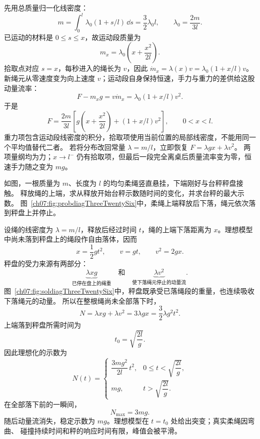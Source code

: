 {\begin{xesolution}
先用总质量归一化线密度：
\[
 m=\int_0^l\lambda_0(1+s/l)\,\dd s=\frac32\lambda_0l,
 \qquad \boxed{\lambda_0=\frac{2m}{3l}}.
\]
已运动的材料是 $0\le s\le x$，故运动段质量为
\[
 \boxed{m_x=\lambda_0\left(x+\frac{x^2}{2l}\right)}.
\]
拾取点对应 $s=x$，每秒进入的绳长为 $v$，因此
$\dot m_x=\lambda(x)v=\lambda_0(1+x/l)v$。
新绳元从零速度变为向上速度 $v$；运动段自身保持恒速，手力与重力的差供给这股动量流率：
\[
 F-m_xg=v\dot m_x=\lambda_0(1+x/l)v^2.
\]
于是
\[
 \boxed{F=\frac{2m}{3l}\left[g\left(x+\frac{x^2}{2l}\right)
 +(1+x/l)v^2\right]},\qquad 0<x<l.
\]
重力项包含运动段线密度的积分，拾取项使用当前位置的局部线密度，不能用同一个平均值替代二者。
若将分布改回常量 $\lambda=m/l$，立即恢复 $F=\lambda gx+\lambda v^2$。
两项量纲均为力；$x\to l^-$ 仍有拾取项，但最后一段完全离桌后质量流率变为零，恒速手力随之变为 $mg$。
\end{xesolution}

\begin{origexamplebox}{}\label{ch07:ex:s09-3-26}
如图，一根质量为 $m$、长度为 $l$ 的均匀柔绳竖直悬挂，下端刚好与台秤秤盘接触。
释放绳的上端，求从释放开始台秤示数随时间的变化，并求台秤的最大示数。
图~\ref{ch07:fig:probdiagThreeTwentySix}中，柔绳上端释放后下落，绳元依次落到秤盘上并停止。
\probdiagThreeTwentySix
\end{origexamplebox}

\begin{xesolution}
设绳的线密度为 $\lambda=m/l$，释放后经过时间 $t$，绳的上端下落距离为 $x$。理想模型
中尚未落到秤盘上的绳段作自由落体，因而
\[
 x=\frac12gt^2,\qquad v=gt,\qquad v^2=2gx.
\]
秤盘的受力来源有两部分：
\[
 \underbrace{\lambda xg}_{\text{已停在盘上的绳重}}
 \quad\text{和}\quad
 \underbrace{\lambda v^2}_{\text{使下落绳元停止的动量流}}.
\]
图~\ref{ch07:fig:soldiagThreeTwentySix}中，秤盘既承受已落绳段的重量，也连续吸收下落绳元的动量。
\soldiagThreeTwentySix
所以在整根绳尚未全部落下时，
\[
 N=\lambda xg+\lambda v^2
 =3\lambda gx
 =\frac32\lambda g^2t^2.
\]
上端落到秤盘所需时间为
\[
 t_0=\sqrt{\frac{2l}{g}}.
\]
因此理想化的示数为
\[
 \boxed{
 N(t)=
 \begin{cases}
 \dfrac{3m g^2}{2l}\,t^2,
   &0\le t<\sqrt{\dfrac{2l}{g}},\\[6pt]
 mg,&t>\sqrt{\dfrac{2l}{g}}.
 \end{cases}}
\]
在全部落下前的一瞬间，
\[
 \boxed{N_{\max}=3mg}.
\]
随后动量流消失，稳定示数为 $mg$。理想模型在 $t=t_0$ 处给出突变；真实柔绳因弯曲、
碰撞持续时间和秤的响应时间有限，峰值会被平滑。
\end{xesolution}

}
